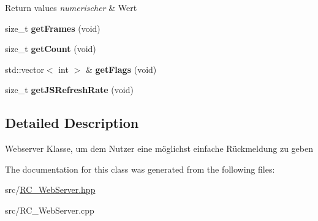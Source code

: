 \begin{DoxyRetVals}{Return values}
{\em numerischer} & Wert \\
\hline
\end{DoxyRetVals}
\begin{DoxyCompactItemize}
\item 
\hypertarget{classrc_1_1WebServer_a1f8551f408b09eb67a49d050f253ed1f}{size\+\_\+t {\bfseries get\+Frames} (void)}\label{classrc_1_1WebServer_a1f8551f408b09eb67a49d050f253ed1f}

\item 
\hypertarget{classrc_1_1WebServer_ab0807008779f05091bab37f158b65b34}{size\+\_\+t {\bfseries get\+Count} (void)}\label{classrc_1_1WebServer_ab0807008779f05091bab37f158b65b34}

\item 
\hypertarget{classrc_1_1WebServer_a877ed11cc160de9b56851dafe396d25a}{std\+::vector$<$ int $>$ \& {\bfseries get\+Flags} (void)}\label{classrc_1_1WebServer_a877ed11cc160de9b56851dafe396d25a}

\item 
\hypertarget{classrc_1_1WebServer_a828c817ba9585fc0639f7a025e2a547e}{size\+\_\+t {\bfseries get\+J\+S\+Refresh\+Rate} (void)}\label{classrc_1_1WebServer_a828c817ba9585fc0639f7a025e2a547e}

\end{DoxyCompactItemize}


\subsection{Detailed Description}
Webserver Klasse, um dem Nutzer eine möglichst einfache Rückmeldung zu geben 

The documentation for this class was generated from the following files\+:\begin{DoxyCompactItemize}
\item 
src/\hyperlink{RC__WebServer_8hpp}{R\+C\+\_\+\+Web\+Server.\+hpp}\item 
src/R\+C\+\_\+\+Web\+Server.\+cpp\end{DoxyCompactItemize}
